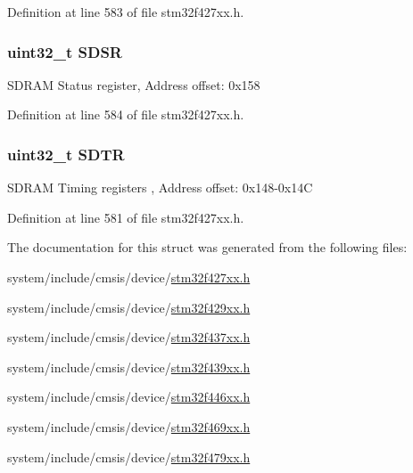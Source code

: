 Definition at line 583 of file stm32f427xx.\+h.

\subsubsection[{\texorpdfstring{S\+D\+SR}{SDSR}}]{ uint32\+\_\+t S\+D\+SR}\hypertarget{struct_f_m_c___bank5__6___type_def_ac36dc12c736f19eb2bc33fd6ab4c02de}{}\label{struct_f_m_c___bank5__6___type_def_ac36dc12c736f19eb2bc33fd6ab4c02de}
S\+D\+R\+AM Status register, Address offset\+: 0x158 

Definition at line 584 of file stm32f427xx.\+h.

\subsubsection[{\texorpdfstring{S\+D\+TR}{SDTR}}]{ uint32\+\_\+t S\+D\+TR}\hypertarget{struct_f_m_c___bank5__6___type_def_a1270b172aa29c22a793ebc5e203108d7}{}\label{struct_f_m_c___bank5__6___type_def_a1270b172aa29c22a793ebc5e203108d7}
S\+D\+R\+AM Timing registers , Address offset\+: 0x148-\/0x14C 

Definition at line 581 of file stm32f427xx.\+h.



The documentation for this struct was generated from the following files\+:\begin{DoxyCompactItemize}
\item 
system/include/cmsis/device/\hyperlink{stm32f427xx_8h}{stm32f427xx.\+h}\item 
system/include/cmsis/device/\hyperlink{stm32f429xx_8h}{stm32f429xx.\+h}\item 
system/include/cmsis/device/\hyperlink{stm32f437xx_8h}{stm32f437xx.\+h}\item 
system/include/cmsis/device/\hyperlink{stm32f439xx_8h}{stm32f439xx.\+h}\item 
system/include/cmsis/device/\hyperlink{stm32f446xx_8h}{stm32f446xx.\+h}\item 
system/include/cmsis/device/\hyperlink{stm32f469xx_8h}{stm32f469xx.\+h}\item 
system/include/cmsis/device/\hyperlink{stm32f479xx_8h}{stm32f479xx.\+h}\end{DoxyCompactItemize}
